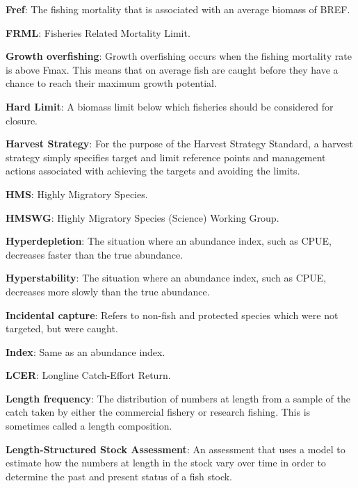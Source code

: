 \documentclass{mpi-plenary}
\theoremstyle{definition}
\theoremstyle{definition}
\theoremstyle{definition}
\theoremstyle{remark}
\begin{document}
\protect\hypertarget{def-fref}{}{} \textbf{Fref}: The fishing mortality
that is associated with an average biomass of BREF.

\protect\hypertarget{def-frml}{}{} \textbf{FRML}: Fisheries Related
Mortality Limit.

\protect\hypertarget{def-growth-overfishing}{}{} \textbf{Growth
overfishing}: Growth overfishing occurs when the fishing mortality rate
is above Fmax. This means that on average fish are caught before they
have a chance to reach their maximum growth potential.

\protect\hypertarget{def-hard-limit}{}{} \textbf{Hard Limit}: A biomass
limit below which fisheries should be considered for closure.

\protect\hypertarget{def-harvest-strategy}{}{} \textbf{Harvest
Strategy}: For the purpose of the Harvest Strategy Standard, a harvest
strategy simply specifies target and limit reference points and
management actions associated with achieving the targets and avoiding
the limits.

\protect\hypertarget{def-hms}{}{} \textbf{HMS}: Highly Migratory
Species.

\protect\hypertarget{def-hmswg}{}{} \textbf{HMSWG}: Highly Migratory
Species (Science) Working Group.

\protect\hypertarget{def-hyperdepletion}{}{} \textbf{Hyperdepletion}:
The situation where an abundance index, such as CPUE, decreases faster
than the true abundance.

\protect\hypertarget{def-hyperstability}{}{} \textbf{Hyperstability}:
The situation where an abundance index, such as CPUE, decreases more
slowly than the true abundance.

\protect\hypertarget{def-incidental-capture}{}{} \textbf{Incidental
capture}: Refers to non-fish and protected species which were not
targeted, but were caught.

\protect\hypertarget{def-index}{}{} \textbf{Index}: Same as an abundance
index.

\protect\hypertarget{def-lcer}{}{} \textbf{LCER}: Longline Catch-Effort
Return.

\protect\hypertarget{def-length-frequency}{}{} \textbf{Length
frequency}: The distribution of numbers at length from a sample of the
catch taken by either the commercial fishery or research fishing. This
is sometimes called a length composition.

\protect\hypertarget{def-length-structured-stock-assessment}{}{}
\textbf{Length-Structured Stock Assessment}: An assessment that uses a
model to estimate how the numbers at length in the stock vary over time
in order to determine the past and present status of a fish stock.
\end{document}
